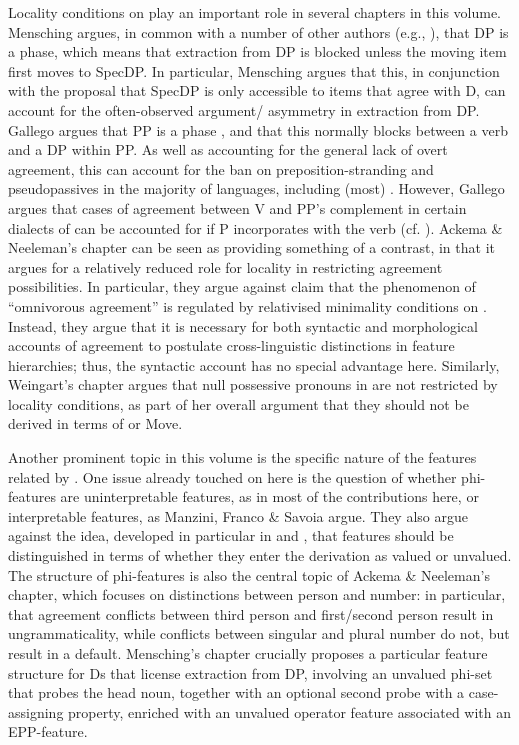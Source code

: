 \documentclass[output=paper]{langsci/langscibook}
\begin{document}
Locality conditions on  play an important role in several chapters in this volume. Mensching argues, in common with a number of other authors (e.g., \citealt{Svenonius2004,Bošković2005,Heck2009,Reeve2018}), that DP is a phase, which means that extraction from DP is blocked unless the moving item first moves to SpecDP. In particular, Mensching argues that this, in conjunction with the proposal that SpecDP is only accessible to items that agree with D, can account for the often-observed argument\slash {} asymmetry in extraction from DP. Gallego argues that PP is a phase \citep{Abels2003,Abels2012}, and that this normally blocks  between a verb and a DP within PP. As well as accounting for the general lack of overt agreement, this can account for the ban on preposition-stranding and pseudopassives in the majority of languages, including (most)  \citep{Law2006}. However, Gallego argues that cases of agreement between V and PP’s complement in certain dialects of  can be accounted for if P incorporates with the verb (cf. \citealt{Hornstein1981,Law2006}). Ackema \& Neeleman’s chapter can be seen as providing something of a contrast, in that it argues for a relatively reduced role for locality in restricting agreement possibilities. In particular, they argue against  claim that the phenomenon of ``omnivorous agreement'' is regulated by relativised minimality conditions on . Instead, they argue that it is necessary for both syntactic and morphological accounts of agreement to postulate cross-linguistic distinctions in feature hierarchies; thus, the syntactic account has no special advantage here. Similarly, Weingart’s chapter argues that null possessive pronouns in  are not restricted by locality conditions, as part of her overall argument that they should not be derived in terms of  or Move.

Another prominent topic in this volume is the specific nature of the features related by . One issue already touched on here is the question of whether phi-features are uninterpretable features, as in most of the contributions here, or interpretable features, as Manzini, Franco \& Savoia argue. They also argue against the idea, developed in particular in \citet{Chomsky2000} and \citet{Pesetsky2007}, that features should be distinguished in terms of whether they enter the derivation as valued or unvalued. The structure of phi-features is also the central topic of Ackema \& Neeleman’s chapter, which focuses on distinctions between person and number: in particular, that agreement conflicts between third person and first\slash second person result in ungrammaticality, while conflicts between singular and plural number do not, but result in a default. Mensching’s chapter crucially proposes a particular feature structure for Ds that license extraction from DP, involving an unvalued phi-set that probes the head noun, together with an optional second probe with a case-assigning property, enriched with an unvalued operator feature associated with an EPP-feature.
\end{document}
